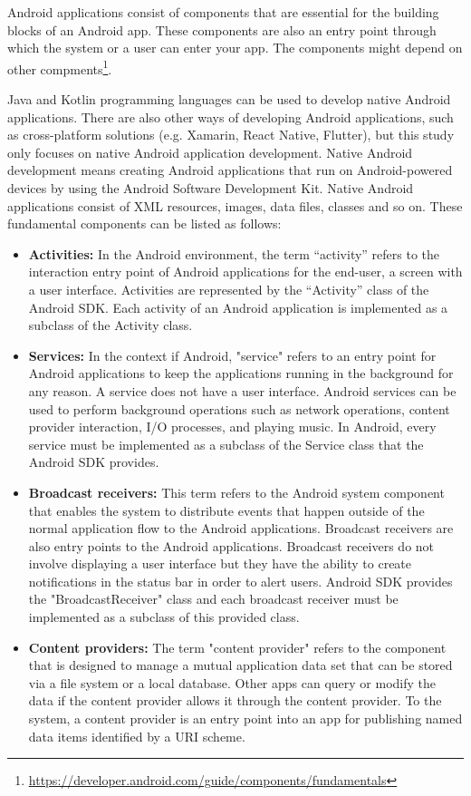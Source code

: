 Android applications consist of components that are essential for the building blocks of an Android app. These components are also an entry point through which the system or a user can enter your app. The components might depend on other compments\footnote{\url{https://developer.android.com/guide/components/fundamentals}}.

Java and Kotlin programming languages can be used to develop native Android applications. There are also other ways of developing Android applications, such as cross-platform solutions (e.g. Xamarin, React Native, Flutter), but this study only focuses on native Android application development. Native Android development means creating Android applications that run on Android-powered devices by using the Android Software Development Kit. Native Android applications consist of  XML resources, images, data files, classes and so on. These fundamental components can be listed as follows: 
\begin{itemize}
    \item \textbf{Activities:} In the Android environment, the term “activity” refers to the interaction entry point of Android applications for the end-user, a screen with a user interface. Activities are represented by the “Activity” class of the Android SDK. Each activity of an Android application is implemented as a subclass of the Activity class.
    \item \textbf{Services:} In the context if Android, "service" refers to an entry point for Android applications to keep the applications running in the background for any reason. A service does not have a user interface. Android services can be used to perform background operations such as network operations, content provider interaction, I/O processes, and playing music. In Android, every service must be implemented as a subclass of the Service class that the Android SDK provides.
    \item \textbf{Broadcast receivers:} This term refers to the Android system component that enables the system to distribute events that happen outside of the normal application flow to the Android applications. Broadcast receivers are also entry points to the Android applications. Broadcast receivers do not involve displaying a user interface but they have the ability to create notifications in the status bar in order to alert users. Android SDK provides the "BroadcastReceiver" class and each broadcast receiver must be implemented as a subclass of this provided class.
    \item \textbf{Content providers:} The term "content provider" refers to the component that is designed to manage a mutual application data set that can be stored via a file system or a local database. Other apps can query or modify the data if the content provider allows it through the content provider. To the system, a content provider is an entry point into an app for publishing named data items identified by a URI scheme.
\end{itemize}

